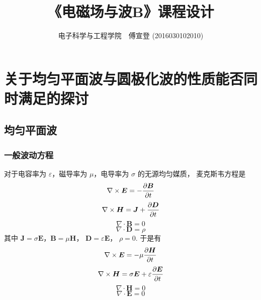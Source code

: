\documentclass[UTF8,linespread=1.236]{ctexart}
\newcommand\cu[1]{\boldsymbol{#1}}
\newcommand\pypx[2]{{{\partial {#1}} \over {\partial {#2}}}}
\begin{document}
\title{《电磁场与波B》课程设计}
\author{电子科学与工程学院\ \ 傅宣登 (2016030102010)}

\maketitle

\section{关于均匀平面波与圆极化波的性质能否同时满足的探讨}

\subsection{均匀平面波}

\subsubsection{一般波动方程}

对于电容率为 $\varepsilon$，磁导率为 $\mu$，电导率为 $\sigma$
的无源均匀媒质，
麦克斯韦方程是
\begin{equation}%
    \nabla \times \cu{E} = - \pypx{\cu{B}}{t}
\end{equation}
\begin{equation}
    \nabla \times \cu{H} = \cu{J} + \pypx{\cu{D}}{t}
\end{equation}
\begin{equation}
    \nabla \cdot \cu{B} = 0
\end{equation}
\begin{equation}
    \nabla \cdot \cu{D} = \rho
\end{equation}
其中 $\cu{J} = \sigma\cu{E}$，$\cu{B} = \mu\cu{H}$，
$\cu{D} = \varepsilon\cu{E}$，
$\rho = 0$. 于是有
\begin{equation}
    \label{eq81}
    \nabla \times \cu{E} = -\mu \pypx{\cu{H}}{t}
\end{equation}
\begin{equation}
    \label{eq82}
    \nabla \times \cu{H} = \sigma\cu{E} + \varepsilon\pypx{\cu{E}}{t}
\end{equation}
\begin{equation}
    \label{eq83}
    \nabla \cdot \cu{H} = 0
\end{equation}
\begin{equation}
    \label{eq84}
    \nabla \cdot \cu{E} = 0
\end{equation}
\end{document}
